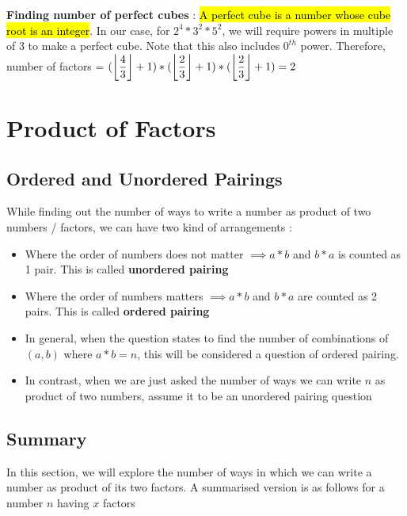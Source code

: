 \textbf{Finding number of perfect cubes} : \hl{A perfect cube is a number whose cube root is an integer}. In our case, for $2^4 * 3^2 * 5^2$, we will require powers in multiple of 3 to make a perfect cube. Note that this also includes $0^{th}$ power. Therefore, number of factors = $( \displaystyle{\left \lfloor { \dfrac{4}{3} } \right \rfloor} + 1 ) * (\displaystyle{\left \lfloor { \dfrac{2}{3} } \right \rfloor} + 1) * (\displaystyle{\left \lfloor { \dfrac{2}{3} } \right \rfloor} + 1) = 2$ \\

\section{Product of Factors}

\subsection{Ordered and Unordered Pairings}
While finding out the number of ways to write a number as product of two numbers / factors, we can have two kind of arrangements : 
\begin{itemize}
    \item Where the order of numbers does not matter $\implies a * b$ and $b * a$ is counted as 1 pair. This is called \textbf{unordered pairing}
    
    \item Where the order of numbers matters $\implies a * b$ and $b * a$ are counted as 2 pairs. This is called \textbf{ordered pairing}

    \item In general, when the question states to find the number of combinations of $(a,b)$ where $a * b = n$, this will be considered a question of ordered pairing.

    \item In contrast, when we are just asked the number of ways we can write $n$ as product of two numbers, assume it to be an unordered pairing question
\end{itemize}

  
\subsection{Summary}

In this section, we will explore the number of ways in which we can write a number as product of its two factors. A summarised version is as follows for a number $n$ having $x$ factors

